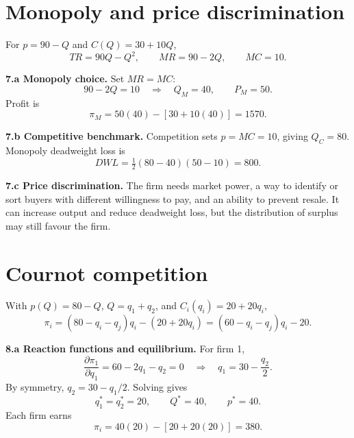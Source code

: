 \documentclass[11pt,a4paper]{article}
\begin{document}
\section{Monopoly and price discrimination}

For \(p=90-Q\) and \(C(Q)=30+10Q\),
\[
TR=90Q-Q^2,\qquad MR=90-2Q,\qquad MC=10.
\]

\textbf{7.a Monopoly choice.} Set \(MR=MC\):
\[
90-2Q=10\quad\Longrightarrow\quad Q_M=40,\qquad P_M=50.
\]
Profit is
\[
\pi_M=50(40)-[30+10(40)]=\boxed{1570}.
\]

\textbf{7.b Competitive benchmark.} Competition sets \(p=MC=10\), giving
\(Q_C=80\). Monopoly deadweight loss is
\[
\boxed{DWL=\tfrac12(80-40)(50-10)=800}.
\]

\begin{center}
\end{center}

\textbf{7.c Price discrimination.} The firm needs market power, a way to
identify or sort buyers with different willingness to pay, and an ability to
prevent resale. It can increase output and reduce deadweight loss, but the
distribution of surplus may still favour the firm.

\section{Cournot competition}

With \(p(Q)=80-Q\), \(Q=q_1+q_2\), and \(C_i(q_i)=20+20q_i\),
\[
\pi_i=(80-q_i-q_j)q_i-(20+20q_i)=(60-q_i-q_j)q_i-20.
\]

\textbf{8.a Reaction functions and equilibrium.} For firm 1,
\[
\frac{\partial\pi_1}{\partial q_1}=60-2q_1-q_2=0
\quad\Longrightarrow\quad q_1=30-\frac{q_2}{2}.
\]
By symmetry, \(q_2=30-q_1/2\). Solving gives
\[
\boxed{q_1^*=q_2^*=20,\qquad Q^*=40,\qquad p^*=40}.
\]
Each firm earns
\[
\pi_i=40(20)-[20+20(20)]=\boxed{380}.
\]
\end{document}
